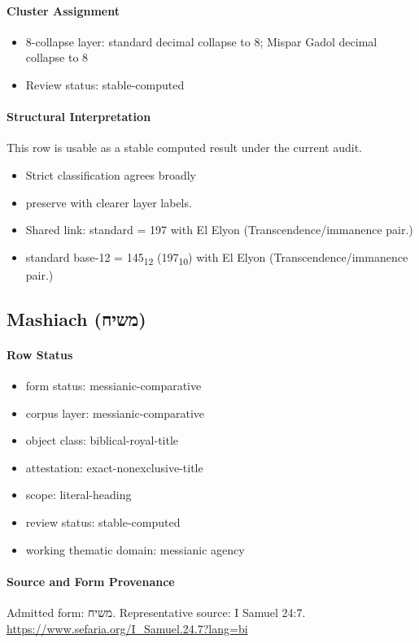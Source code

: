 \paragraph{Cluster Assignment}
\begin{itemize}
\item 8-collapse layer: standard decimal collapse to 8; Mispar Gadol decimal collapse to 8
\item Review status: stable-computed
\end{itemize}
\paragraph{Structural Interpretation}
This row is usable as a stable computed result under the current audit.

\begin{itemize}
\item Strict classification agrees broadly
\item preserve with clearer layer labels.
\item Shared link: standard = 197 with El Elyon (Transcendence/immanence pair.)
\item standard base-12 = 145\textsubscript{12} (197\textsubscript{10}) with El Elyon (Transcendence/immanence pair.)
\end{itemize}

\subsection{Mashiach (משיח)}
\paragraph{Row Status}
\begin{itemize}
\item form status: messianic-comparative
\item corpus layer: messianic-comparative
\item object class: biblical-royal-title
\item attestation: exact-nonexclusive-title
\item scope: literal-heading
\item review status: stable-computed
\item working thematic domain: messianic agency
\end{itemize}
\paragraph{Source and Form Provenance}
Admitted form: משיח.
Representative source: I Samuel 24:7.
\url{https://www.sefaria.org/I_Samuel.24.7?lang=bi}
